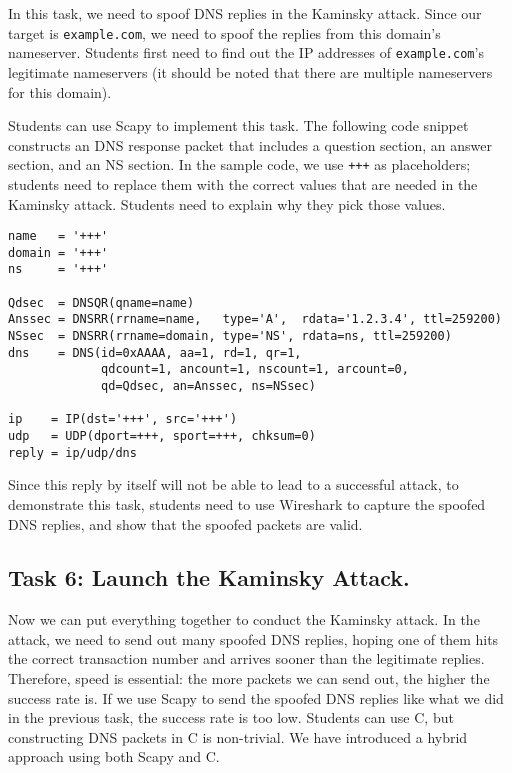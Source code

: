 In this task, we need to spoof DNS replies in the Kaminsky attack. 
Since our target is \texttt{example.com}, we need to spoof
the replies from this domain's nameserver. Students first need to 
find out the IP addresses of \texttt{example.com}'s legitimate 
nameservers (it should be noted that there are multiple 
nameservers for this domain).

Students can use Scapy to implement this task. The following 
code snippet constructs an DNS response packet that includes 
a question section, an answer section, and an NS section. 
In the sample code, we use \texttt{+++} as placeholders; 
students need to replace them with the correct values 
that are needed in the Kaminsky attack. Students need to explain
why they pick those values. 

\begin{lstlisting}
name   = '+++'  
domain = '+++'  
ns     = '+++'

Qdsec  = DNSQR(qname=name)
Anssec = DNSRR(rrname=name,   type='A',  rdata='1.2.3.4', ttl=259200)
NSsec  = DNSRR(rrname=domain, type='NS', rdata=ns, ttl=259200)
dns    = DNS(id=0xAAAA, aa=1, rd=1, qr=1,
             qdcount=1, ancount=1, nscount=1, arcount=0,
             qd=Qdsec, an=Anssec, ns=NSsec)

ip    = IP(dst='+++', src='+++')
udp   = UDP(dport=+++, sport=+++, chksum=0)
reply = ip/udp/dns
\end{lstlisting}
 

Since this reply by itself will not be able to lead to a successful 
attack, to demonstrate this task, students need to 
use Wireshark to capture the spoofed DNS replies, and 
show that the spoofed packets are valid. 


\subsection{Task 6: Launch the Kaminsky Attack.}   

Now we can put everything together to conduct the Kaminsky attack. 
In the attack, we need to send out many spoofed DNS replies, hoping 
one of them hits the correct transaction number and arrives sooner
than the legitimate replies. Therefore, speed is essential: the more packets 
we can send out, the higher the success rate is. If we use 
Scapy to send the spoofed DNS replies like what we did in the 
previous task, the success rate is too low. Students can use 
C, but constructing DNS packets in C is non-trivial. 
We have introduced a hybrid approach using both Scapy and C. 


